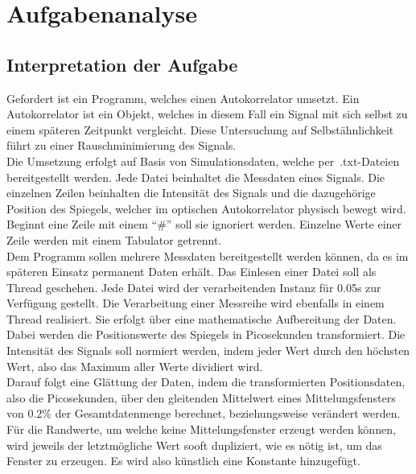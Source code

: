 \chapter{Aufgabenanalyse}\label{ch:aufgabenanalyse}


\section{Interpretation der Aufgabe}\label{sec:interpretation-der-aufgabe}
Gefordert ist ein Programm, welches einen Autokorrelator umsetzt.
Ein Autokorrelator ist ein Objekt, welches in diesem Fall ein Signal mit sich selbst zu einem späteren Zeitpunkt vergleicht.
Diese Untersuchung auf Selbstähnlichkeit führt zu einer Rauschminimierung des Signals.\\

Die Umsetzung erfolgt auf Basis von Simulationsdaten, welche per~.txt-Dateien bereitgestellt werden.
Jede Datei beinhaltet die Messdaten eines Signals.
Die einzelnen Zeilen beinhalten die Intensität des Signals und die dazugehörige Position des Spiegels, welcher im optischen Autokorrelator physisch bewegt wird.\\
Beginnt eine Zeile mit einem \enquote{\#} soll sie ignoriert werden.
Einzelne Werte einer Zeile werden mit einem Tabulator getrennt.\\
Dem Programm sollen mehrere Messdaten bereitgestellt werden können, da es im späteren Einsatz permanent Daten erhält.
Das Einlesen einer Datei soll als Thread geschehen.
Jede Datei wird der verarbeitenden Instanz für 0.05s zur Verfügung gestellt.
Die Verarbeitung einer Messreihe wird ebenfalls in einem Thread realisiert.
Sie erfolgt über eine mathematische Aufbereitung der Daten.
Dabei werden die Positionswerte des Spiegels in Picosekunden transformiert.
Die Intensität des Signals soll normiert werden, indem jeder Wert durch den höchsten Wert, also das Maximum aller Werte dividiert wird.\\
Darauf folgt eine Glättung der Daten, indem die transformierten Positionsdaten, also die Picosekunden, über den gleitenden Mittelwert eines Mittelungsfensters von $0.2\%$ der Gesamtdatenmenge berechnet, beziehungsweise verändert werden.\\
Für die Randwerte, um welche keine Mittelungsfenster erzeugt werden können, wird jeweils der letztmögliche Wert sooft dupliziert, wie es nötig ist, um das Fenster zu erzeugen.
Es wird also künstlich eine Konstante hinzugefügt.\\


